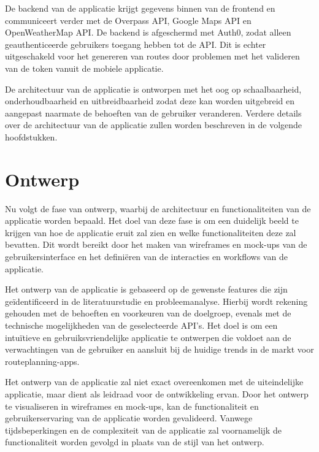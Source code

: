 \vspace{1cm}


De backend van de applicatie krijgt gegevens binnen van de frontend en communiceert verder met de Overpass API, Google Maps API en OpenWeatherMap API. De backend is afgeschermd met Auth0, zodat alleen geauthenticeerde gebruikers toegang hebben tot de API. Dit is echter uitgeschakeld voor het genereren van routes door problemen met het valideren van de token vanuit de mobiele applicatie.

\vspace{1cm}


De architectuur van de applicatie is ontworpen met het oog op schaalbaarheid, onderhoudbaarheid en uitbreidbaarheid zodat deze kan worden uitgebreid en aangepast naarmate de behoeften van de gebruiker veranderen. Verdere details over de architectuur van de applicatie zullen worden beschreven in de volgende hoofdstukken.

\section{Ontwerp}

Nu volgt de fase van ontwerp, waarbij de architectuur en functionaliteiten van de applicatie worden bepaald. Het doel van deze fase is om een duidelijk beeld te krijgen van hoe de applicatie eruit zal zien en welke functionaliteiten deze zal bevatten. Dit wordt bereikt door het maken van wireframes en mock-ups van de gebruikersinterface en het definiëren van de interacties en workflows van de applicatie.

\vspace{1cm}


Het ontwerp van de applicatie is gebaseerd op de gewenste features die zijn geïdentificeerd in de literatuurstudie en probleemanalyse. Hierbij wordt rekening gehouden met de behoeften en voorkeuren van de doelgroep, evenals met de technische mogelijkheden van de geselecteerde API's. Het doel is om een intuïtieve en gebruiksvriendelijke applicatie te ontwerpen die voldoet aan de verwachtingen van de gebruiker en aansluit bij de huidige trends in de markt voor routeplanning-apps.

\vspace{1cm}


Het ontwerp van de applicatie zal niet exact overeenkomen met de uiteindelijke applicatie, maar dient als leidraad voor de ontwikkeling ervan. Door het ontwerp te visualiseren in wireframes en mock-ups, kan de functionaliteit en gebruikerservaring van de applicatie worden gevalideerd. Vanwege tijdsbeperkingen en de complexiteit van de applicatie zal voornamelijk de functionaliteit worden gevolgd in plaats van de stijl van het ontwerp.

